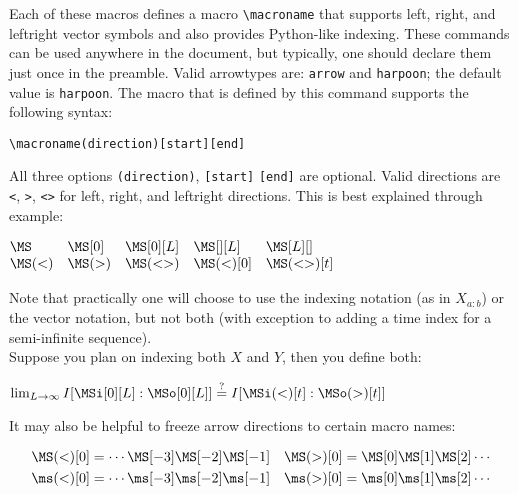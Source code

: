 \documentclass{article}
\begin{document}
Each of these macros defines a macro \verb+\macroname+ that supports
left, right, and leftright vector symbols and also provides Python-like
indexing.  These commands can be used anywhere in the document, but typically,
one should declare them just once in the preamble. Valid arrowtypes are:
\verb+arrow+ and \verb+harpoon+; the default value is \verb+harpoon+.
The macro that is defined by this command supports the following syntax:
\begin{center}
\verb+\macroname(direction)[start][end]+
\end{center}
All three options \verb+(direction)+, \verb+[start]+ \verb+[end]+ are
optional. Valid directions are \verb+<+, \verb+>+, \verb+<>+ for left, right,
and leftright directions. This is best explained through example:

\begin{LTXexample}[pos=b]

$\begin{matrix*}[l]
\MS & \MS[0] & \MS[0][L] & \MS[][L] & \MS[L][]\\
\MS(<) & \MS(>) & \MS(<>) & \MS(<)[0] & \MS(<>)[t]
\end{matrix*}$
\end{LTXexample}

Note that practically one will choose to use the indexing notation (as in
$X_{a:b}$) or the vector notation, but not both (with exception to adding a
time index for a semi-infinite sequence).\\

Suppose you plan on indexing both $X$ and $Y$, then you define both:
\begin{LTXexample}[pos=b]
$\lim_{L \to \infty} I[ \MSi[0][L] : \MSo[0][L] ] \stackrel{?}{=} I[ \MSi(<)[t] : \MSo(>)[t]]$
\end{LTXexample}

It may also be helpful to freeze arrow directions to certain macro names:
\begin{LTXexample}[pos=b]
\newcommand{\Past}{\MS(<)}
\newcommand{\past}{\ms(<)}
\newcommand{\Future}{\MS(>)}
\newcommand{\future}{\ms(>)}
\begin{align*}
\Past[0] &= \cdots \MS[-3] \MS[-2] \MS[-1] &
\Future[0] &= \MS[0] \MS[1] \MS[2] \cdots \\
\past[0] &= \cdots \ms[-3] \ms[-2] \ms[-1] &
\future[0] &= \ms[0] \ms[1] \ms[2] \cdots \\
\end{align*}
\end{LTXexample}
\end{document}
